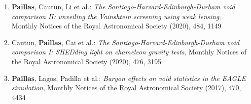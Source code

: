\documentclass[12pt, a4paper]{article} %
\begin{document}
\begin{flushleft}
\begin{enumerate}
\item[3.] \textbf{Paillas}, Cautun, Li et al.: \textit{The Santiago-Harvard-Edinburgh-Durham void comparison II: unveiling the Vainshtein screening using weak lensing}, Monthly Notices of the Royal Astronomical Society (2020), 484, 1149

\item[2.] Cautun, \textbf{Paillas}, Cai et al.: \textit{The Santiago-Harvard-Edinburgh-Durham void comparison I: SHEDding light on chameleon gravity tests}, Monthly Notices of the Royal Astronomical Society (2020), 476, 3195

\item[1.] \textbf{Paillas}, Lagos, Padilla et al.: \textit{Baryon effects on void statistics in the EAGLE simulation}, Monthly Notices of the Royal Astronomical Society (2017), 470, 4434

\end{enumerate}
\end{flushleft}
\end{document}

